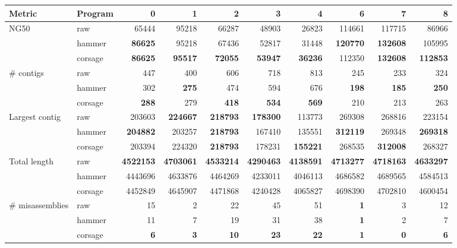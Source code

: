 \documentclass{bioinfo2}
\begin{document}
\begin{table}[p]
{\footnotesize
\begin{tabular}{llrrrrrrrr}
\toprule
Metric & Program & 0 & 1 & 2 & 3 & 4 & 6 & 7 & 8 \\
\midrule
NG50 & raw     & 65444 & 95218 & 66287 & 48903 & 26823 & 114661 & 117715 & 86966 \\
     & hammer  & \textbf{86625} & 95218 & 67436 & 52817 & 31448 & \textbf{120770} & \textbf{132608} & 105995 \\
     & corsage & \textbf{86625} & \textbf{95517} & \textbf{72055} & \textbf{53947} & \textbf{36236} & 112350 & \textbf{132608} & \textbf{112853} \\
\midrule
\# contigs & raw     & 447 & 400 & 606 & 718 & 813 & 245 & 233 & 324 \\
           & hammer  & 302 & \textbf{275} & 474 & 594 & 676 & \textbf{198} & \textbf{185} & \textbf{250} \\
           & corsage & \textbf{288} & 279 & \textbf{418} & \textbf{534} & \textbf{569} & 210 & 213 & 263 \\
\midrule
Largest contig &    raw  & 203603 & \textbf{224667} & \textbf{218793} & \textbf{178300} & 113773 & 269308 & 268816 & 223154 \\
               & hammer  & \textbf{204882} & 203257 & \textbf{218793} & 167410 & 135551 & \textbf{312119} & 269348 & \textbf{269318} \\
               & corsage & 203394 & 224320 & \textbf{218793} & 178231 & \textbf{155221} & 268535 & \textbf{312008} & 268327 \\
\midrule
Total length & raw     & \textbf{4522153} & \textbf{4703061} & \textbf{4533214} & \textbf{4290463} & \textbf{4138591} & \textbf{4713277} & \textbf{4718163} & \textbf{4633297} \\
             & hammer  & 4443696 & 4633876 & 4464269 & 4233011 & 4046113 & 4686582 & 4689565 & 4584513 \\
             & corsage & 4452849 & 4645907 & 4471868 & 4240428 & 4065827 & 4698390 & 4702810 & 4600454 \\
\midrule
\# misassemblies & raw     & 15 & 2 & 22 & 45 & 51 & \textbf{1} & 3 & 12 \\
                 & hammer  & 11 & 7 & 19 & 31 & 38 & \textbf{1} & 2 & 7 \\
                 & corsage & \textbf{6} & \textbf{3} & \textbf{10} & \textbf{23} & \textbf{22} & \textbf{1} & \textbf{0} & \textbf{6} \\

\end{tabular}}
\end{table}
\end{document}
